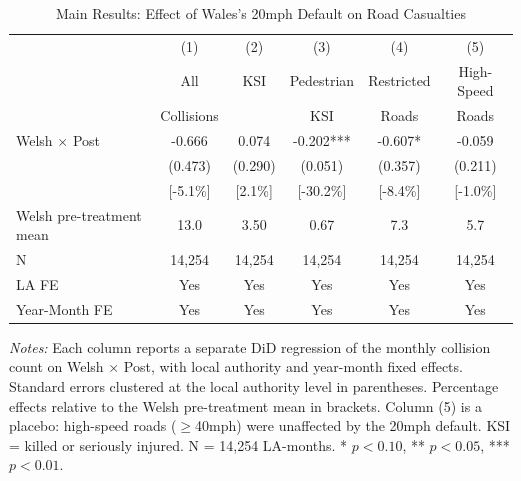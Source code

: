 \begin{table}[H]
\centering
\caption{Main Results: Effect of Wales's 20mph Default on Road Casualties}
\label{tab:main}
\begin{threeparttable}
\begin{tabular}{lccccc}
\toprule
 & (1) & (2) & (3) & (4) & (5) \\
 & All & KSI & Pedestrian & Restricted & High-Speed \\
 & Collisions & & KSI & Roads & Roads \\
\midrule
Welsh $\times$ Post & -0.666 & 0.074 & -0.202*** & -0.607* & -0.059 \\
 & (0.473) & (0.290) & (0.051) & (0.357) & (0.211) \\
 & [-5.1\%] & [2.1\%] & [-30.2\%] & [-8.4\%] & [-1.0\%] \\
\midrule
Welsh pre-treatment mean & 13.0 & 3.50 & 0.67 & 7.3 & 5.7 \\
N & 14,254 & 14,254 & 14,254 & 14,254 & 14,254 \\
LA FE & Yes & Yes & Yes & Yes & Yes \\
Year-Month FE & Yes & Yes & Yes & Yes & Yes \\
\bottomrule
\end{tabular}
\begin{tablenotes}[flushleft]
\small
\item \textit{Notes:} Each column reports a separate DiD regression of the monthly collision count on Welsh $\times$ Post, with local authority and year-month fixed effects. Standard errors clustered at the local authority level in parentheses. Percentage effects relative to the Welsh pre-treatment mean in brackets. Column (5) is a placebo: high-speed roads ($\geq$40mph) were unaffected by the 20mph default. KSI = killed or seriously injured. N = 14,254 LA-months. * $p<0.10$, ** $p<0.05$, *** $p<0.01$.
\end{tablenotes}
\end{threeparttable}
\end{table}
